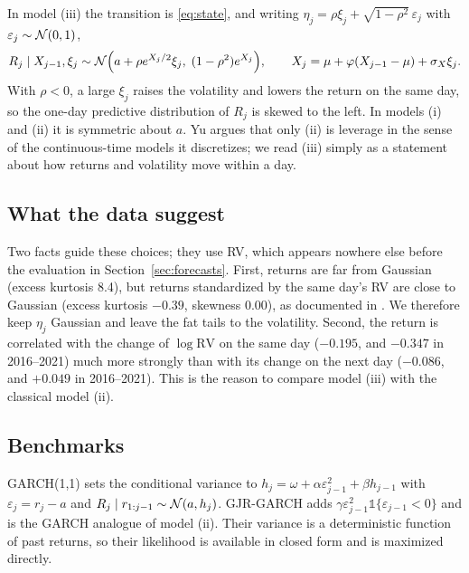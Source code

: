 In model (iii) the transition is \eqref{eq:state}, and writing $\eta_j = \rho\xi_j + \sqrt{1-\rho^2}\,\varepsilon_j$ with $\varepsilon_j \sim \mathcal{N}(0,1)$,
\begin{equation}
        R_j \mid X_{j-1}, \xi_j \sim \mathcal{N}\Big(a + \rho e^{X_j/2}\xi_j,\; (1-\rho^2)e^{X_j}\Big),
        \qquad X_j = \mu + \varphi(X_{j-1} - \mu) + \sigma_X\xi_j.
        \label{eq:g_iii}
\end{equation}
With $\rho < 0$, a large $\xi_j$ raises the volatility and lowers the return on the same day, so the one-day predictive distribution of $R_j$ is skewed to the left. In models (i) and (ii) it is symmetric about $a$. Yu \cite{yu2005} argues that only (ii) is leverage in the sense of the continuous-time models it discretizes; we read (iii) simply as a statement about how returns and volatility move within a day.

\subsection{What the data suggest}

Two facts guide these choices; they use RV, which appears nowhere else before the evaluation in Section~\ref{sec:forecasts}. First, returns are far from Gaussian (excess kurtosis 8.4), but returns standardized by the same day's RV are close to Gaussian (excess kurtosis $-0.39$, skewness $0.00$), as documented in \cite{andersenEtAl2001}. We therefore keep $\eta_j$ Gaussian and leave the fat tails to the volatility. Second, the return is correlated with the change of $\log\mathrm{RV}$ on the same day ($-0.195$, and $-0.347$ in 2016--2021) much more strongly than with its change on the next day ($-0.086$, and $+0.049$ in 2016--2021). This is the reason to compare model (iii) with the classical model (ii).

\subsection{Benchmarks}

GARCH(1,1) \cite{bollerslev1986} sets the conditional variance to $h_j = \omega + \alpha\varepsilon_{j-1}^2 + \beta h_{j-1}$ with $\varepsilon_j = r_j - a$ and $R_j \mid r_{1:j-1} \sim \mathcal{N}(a, h_j)$. GJR-GARCH \cite{glostenEtAl1993} adds $\gamma\varepsilon_{j-1}^2\mathbb{1}\{\varepsilon_{j-1} < 0\}$ and is the GARCH analogue of model (ii). Their variance is a deterministic function of past returns, so their likelihood is available in closed form and is maximized directly.

